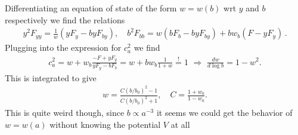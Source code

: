 Differentiating an equation of state of the form $w=w(b)$ wrt $y$ and $b$ respectively we find the relations
\begin{align}
    y^2F_{yy}=\tfrac{1}{w}(yF_y-byF_{by}), \quad b^2F_{bb}=w(bF_b-byF_{by})+bw_b(F-yF_y)\,.
\end{align}
Plugging into the expression for $c_a^2$ we find 
\begin{align}
    c_a^2=w+w_b\frac{-F+yF_y}{yF_y-bF_b}=w+bw_b\tfrac{1}{1+w}\overset{!}{=}1\,\,\Rightarrow\,\,\frac{dw}{d\log b}=1-w^2.
\end{align}
This is integrated to give
\begin{align}
    w=\frac{C(b/b_0)^2-1}{C(b/b_0)^2+1},\quad C=\frac{1+w_0}{1-w_0}.
\end{align}
This is quite weird though, since $b\propto a^{-3}$ it seems we could get the behavior of $w=w(a)$ without knowing the potential $V$ at all